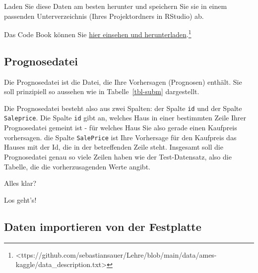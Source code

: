 \documentclass[
  a4paper,
]{scrbook}
\theoremstyle{definition}
\theoremstyle{definition}
\theoremstyle{definition}
\theoremstyle{remark}
\begin{document}
Laden Sie diese Daten am besten herunter und speichern Sie sie in einem
passenden Unterverzeichnis (Ihres Projektordners in RStudio) ab.

Das Code Book können Sie
\href{https://github.com/sebastiansauer/Lehre/blob/main/data/ames-kaggle/data_description.txt}{hier
einsehen und herunterladen}.\footnote{\textless ttps://github.com/sebastiansauer/Lehre/blob/main/data/ames-kaggle/data\_description.txt\textgreater{}}

\subsection{Prognosedatei}\label{prognosedatei}

Die Prognosedatei ist die Datei, die Ihre Vorhersagen (Prognosen)
enthält. Sie soll prinzipiell so aussehen wie in Tabelle~\ref{tbl-subm}
dargestellt.

\begin{table}

\caption{\label{tbl-subm}Beispiel den Aufbau der Prognose-Datei}


\end{table}%

Die Prognosedatei besteht also aus zwei Spalten: der Spalte \texttt{id}
und der Spalte \texttt{Saleprice}. Die Spalte \texttt{id} gibt an,
welches Haus in einer bestimmten Zeile Ihrer Prognosedatei gemeint ist -
für welches Haus Sie also gerade einen Kaufpreis vorhersagen. die Spalte
\texttt{SalePrice} ist Ihre Vorhersage für den Kaufpreis das Hauses mit
der Id, die in der betreffenden Zeile steht. Insgesamt soll die
Prognosedatei genau so viele Zeilen haben wie der Test-Datensatz, also
die Tabelle, die die vorherzusagenden Werte angibt.

Alles klar?

Los geht's!

\subsection{Daten importieren von der
Festplatte}\label{daten-importieren-von-der-festplatte}
\end{document}
